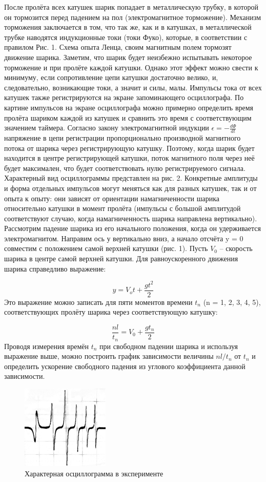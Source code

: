 \documentclass[a4paper, 10pt]{article}%
\begin{document}
После пролёта всех катушек шарик попадает в металлическую трубку, в которой он тормозится перед падением на пол (электромагнитное торможение). Механизм торможения заключается в том, что так же, как и в катушках, в металлической трубке наводятся индукционные токи (токи 
Фуко), которые, в соответствии с правилом Рис. 1. Схема опыта Ленца, своим магнитным полем тормозят движение шарика. Заметим, что шарик будет неизбежно испытывать некоторое торможение и при пролёте каждой катушки. Однако этот эффект можно свести к минимуму, если сопротивление цепи катушки достаточно велико, и, следовательно, возникающие токи, а значит и силы, малы.
Импульсы тока от всех катушек также регистрируются на экране запоминающего осциллографа. По картине импульсов на экране осциллографа можно примерно определить время пролёта шариком каждой из катушек и сравнить это время с соответствующим значением таймера. Согласно закону электромагнитной индукции $\epsilon = - \frac{d\Phi}{dt}$ напряжение в цепи регистрации пропорционально производной магнитного потока от шарика через регистрирующую катушку. Поэтому, когда шарик будет находится в центре регистрирующей катушки, поток магнитного поля через неё будет максимален, что будет соответствовать нулю регистрируемого сигнала. Характерный вид осциллограммы представлен на рис. 2. Конкретные амплитуды и форма отдельных импульсов могут меняться как для разных катушек, так и от опыта к опыту: они зависят от ориентации намагниченности шарика относительно катушки в момент пролёта (импульсы с большой амплитудой соответствуют случаю, когда намагниченность шарика направлена вертикально). Рассмотрим падение шарика из его начального положения, когда он удерживается электромагнитом. Направим ось у вертикально вниз, а начало отсчёта y = 0 совместим с положением самой верхней катушки (рис. 1). 
Пусть $V_0$ – скорость шарика в центре самой верхней катушки. Для равноускоренного движения шарика справедливо выражение: 

\[y = V_o t + \frac{g t^2}{2}\]
Это выражение можно записать для пяти моментов времени $t_n$ (n = 1, 2, 3, 4, 5), соответствующих пролёту шарика через соответствующую катушку: 

\[\frac{nl}{t_n} = V_0 + \frac{g t_n}{2}\]
Проводя измерения времён $t_n$ при свободном падении шарика и используя выражение выше, можно построить график зависимости величины $nl/t_n$ от $t_n$  и определить ускорение свободного падения из углового коэффициента данной зависимости. 
\begin{figure}[h]
    \centering
    \includegraphics[width=0.15\linewidth]{изображение1.png}
    \caption{Характерная осциллограмма в эксперименте}
    \label{fig:enter-label}
\end{figure}
\end{document}
